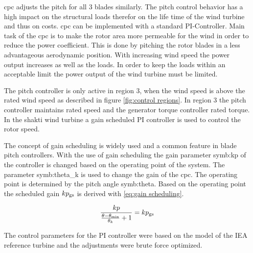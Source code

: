 \gls{cpc} adjusts the pitch for all 3 blades similarly.
The pitch control behavior has a high impact on the structural loads therefor on the life time of the wind turbine and thus on costs.
\gls{cpc} can be implemented with a standard PI-Controller.
Main task of the \gls{cpc} is to make the rotor area more permeable for the wind in order to reduce the power coefficient.
This is done by pitching the rotor blades in a less advantageous aerodynamic position.
With increasing wind speed the power output increases as well as the loads.
In order to keep the loads within an acceptable limit the power output of the wind turbine must be limited.

The pitch controller is only active in region 3, when the wind speed is above the rated wind speed as described in figure \ref{fig:control regions}.
In region 3 the pitch controller maintains rated speed and the generator torque controller rated torque. \cite{SchlipfLecture}
In the \gls{shakti} wind turbine a gain scheduled PI controller is used to control the rotor speed. 

The concept of gain scheduling is widely used and a common feature in blade pitch controllers.
With the use of gain scheduling the gain parameter \gls{symb:kp} of the controller is changed based on the operating point of the system.
The parameter \gls{symb:theta_k} is used to change the gain of the \gls{cpc}.
The operating point is determined by the pitch angle \gls{symb:theta}. Based on the operating point the scheduled gain $kp_\textnormal{gs}$ is derived with \ref{eq:gain scheduling}.

\begin{equation}
	\frac{kp}{\frac{\theta - \theta_\textnormal{min}}{\theta_k} + 1} = kp_\textnormal{gs}
	\label{eq:gain scheduling}
\end{equation}

The control parameters for the PI controller were based on the model of the IEA reference turbine \cite{IEA} and the adjustments were brute force optimized.